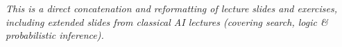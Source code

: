 

\renewcommand{\course}{Introduction to Artificial Intelligence}
\renewcommand{\coursepicture}{course_ai}
\renewcommand{\coursedate}{Summer 2026}

\script

\usepackage{etoolbox}

\newlength\rightmargintoc
\setlength\rightmargintoc{\linewidth}
\addtolength\rightmargintoc{-7em}

\makeatletter
\def\subsubsectocline#1#2#3#4#5{%
\parshape 2 4em \rightmargintoc \dimexpr\parindent+4em\relax \rightmargintoc
\@tempdima#3
\ifdim\lastskip=1sp;\relax\ \else\fi{\footnotesize#4}\hskip1sp%
}
\renewcommand*\l@subsubsection{\subsubsectocline{1}{0em}{3em}}
\makeatother


  
\scripttitle

\emph{This is a direct concatenation and reformatting of lecture
    slides and exercises, including extended slides from classical AI lectures (covering search, logic \& probabilistic inference).}

  {\tableofcontents}



\clearpage
\slidefont
\fancyhfoffset{0mm}



